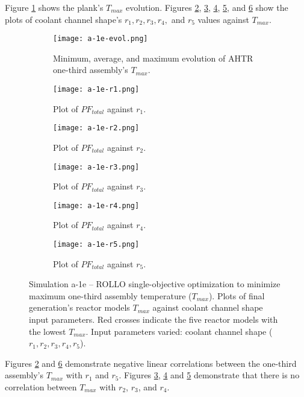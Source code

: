 Figure \ref{fig:a-1e-evol} shows the plank's $T_{max}$ evolution.
Figures \ref{fig:a-1e-r1}, \ref{fig:a-1e-r2}, \ref{fig:a-1e-r3}, \ref{fig:a-1e-r4}, 
and \ref{fig:a-1e-r5} show the plots of coolant channel shape's 
$r_1, r_2, r_3, r_4,$ and $r_5$ values against $T_{max}$. 
\begin{figure}[htbp!]
    \centering
    \begin{subfigure}{0.49\textwidth}
        \texttt{[image: a-1e-evol.png]}
        \caption{Minimum, average, and maximum evolution of AHTR one-third assembly's 
        $T_{max}$.}
        \label{fig:a-1e-evol} 
    \end{subfigure}
    \begin{subfigure}{0.49\textwidth}
        \texttt{[image: a-1e-r1.png]}
        \caption{Plot of $PF_{total}$ against $r_1$.}
        \label{fig:a-1e-r1} 
    \end{subfigure}
    \begin{subfigure}{0.49\textwidth}
        \texttt{[image: a-1e-r2.png]}
        \caption{Plot of $PF_{total}$ against $r_2$.}
        \label{fig:a-1e-r2} 
    \end{subfigure}
    \begin{subfigure}{0.49\textwidth}
        \texttt{[image: a-1e-r3.png]}
        \caption{Plot of $PF_{total}$ against $r_3$.}
        \label{fig:a-1e-r3} 
    \end{subfigure}
    \begin{subfigure}{0.49\textwidth}
        \texttt{[image: a-1e-r4.png]}
        \caption{Plot of $PF_{total}$ against $r_4$.}
        \label{fig:a-1e-r4} 
    \end{subfigure}
    \begin{subfigure}{0.49\textwidth}
        \texttt{[image: a-1e-r5.png]}
        \caption{Plot of $PF_{total}$ against $r_5$.}
        \label{fig:a-1e-r5} 
    \end{subfigure}
    \caption{Simulation a-1e -- ROLLO single-objective optimization to minimize 
    maximum one-third assembly temperature ($T_{max}$). 
    Plots of final generation's reactor models $T_{max}$ against 
    coolant channel shape input parameters. 
    Red crosses indicate the five reactor models with the lowest $T_{max}$.
    Input parameters varied: coolant channel shape ($r_1, r_2, r_3, r_4, r_5$).}
    \label{fig:a-1e}
\end{figure}

Figures \ref{fig:a-1e-r1} and \ref{fig:a-1e-r5} demonstrate negative linear correlations 
between the one-third assembly's $T_{max}$ with $r_1$ and $r_5$. 
Figures \ref{fig:a-1e-r2}, \ref{fig:a-1e-r3} and \ref{fig:a-1e-r4} demonstrate that 
there is no correlation between $T_{max}$ with $r_2$, $r_3$, and $r_4$. 

